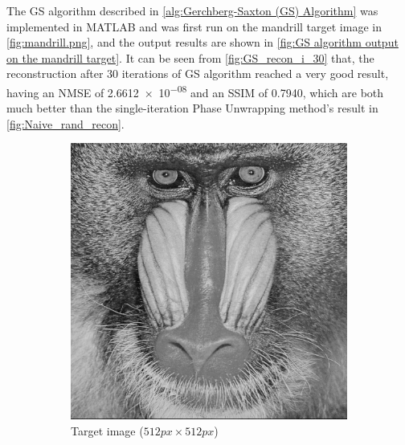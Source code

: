 The GS algorithm described in \cref{alg:Gerchberg-Saxton (GS) Algorithm} was implemented in MATLAB and was first run on the mandrill target image in \cref{fig:mandrill.png}, and the output results are shown in \cref{fig:GS algorithm output on the mandrill target}. It can be seen from \cref{fig:GS_recon_i_30} that, the reconstruction after 30 iterations of GS algorithm reached a very good result, having an NMSE of \num{2.6612e-08} and an SSIM of 0.7940, which are both much better than the single-iteration Phase Unwrapping method's result in \cref{fig:Naive_rand_recon}.

\begin{figure}[H]
  \centering
  \begin{subfigure}[t]{0.3\textwidth}
    \centering
    \includegraphics[width=\textwidth]{mandrill.png}
    \caption{Target image ($512 px\times 512 px$)}
  \end{subfigure}
  \hfill
  \begin{subfigure}[t]{0.3\textwidth}
    \centering

\end{subfigure}
\end{figure}
